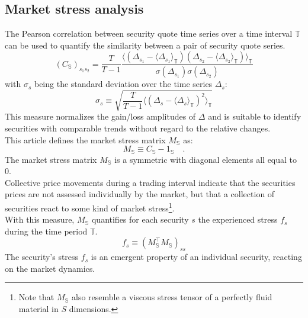 \documentclass[11pt,twoside,a4paper]{article}
\numberwithin{equation}{section}
\begin{document}
\subsection{Market stress analysis}
The Pearson correlation between security quote time series over a time interval $\mathbb{T}$ can be used to quantify the similarity between a pair of security quote series.
\begin{equation}
\left(C_\mathbb{S}\right)_{s_1s_2}=\frac{T}{T-1}\frac{\langle\left(\Delta_{s_1}-\langle\Delta_{s_1}\rangle_\mathbb{T}\right)\left(\Delta_{s_2}-\langle\Delta_{s_2}\rangle_\mathbb{T}\right)\rangle_\mathbb{T}}{\sigma(\Delta_{s_1})\sigma(\Delta_{s_2})}
\end{equation}
with $\sigma_s$ being the standard deviation over the time series $\Delta_s$:
\begin{equation}
\sigma_s \equiv \sqrt{\frac{T}{T-1}\langle\left(\Delta_{s}-\langle\Delta_{s}\rangle_\mathbb{T}\right)^2\rangle_\mathbb{T}}
\end{equation}
This measure normalizes the gain/loss amplitudes of $\Delta$ and is suitable to identify securities with comparable trends without regard to the relative changes.\\
This article defines the market stress matrix $M_\mathbb{S}$ as:
\begin{equation}
M_\mathbb{S}\equiv C_\mathbb{S} - \textrm{1}_\mathbb{S}\quad.
\end{equation}
The market stress matrix $M_\mathbb{S}$ is a symmetric with diagonal elements all equal to $0$.\\
Collective price movements during a trading interval indicate that the securities prices are not assessed individually by the market, but that a collection of securities react to some kind of market stress\footnote{Note that $M_\mathbb{S}$ also resemble a viscous stress tensor of a perfectly fluid material in $S$ dimensions.}.\\
With this measure, $M_\mathbb{S}$ quantifies for each security $s$ the experienced stress $f_s$ during the time period $\mathbb{T}$.
\begin{equation}
f_s\equiv (M_\mathbb{S}^\top M_\mathbb{S})_{ss}
\end{equation}
The security's stress $f_s$ is an emergent property of an individual security, reacting on the market dynamics.\\
\end{document}
